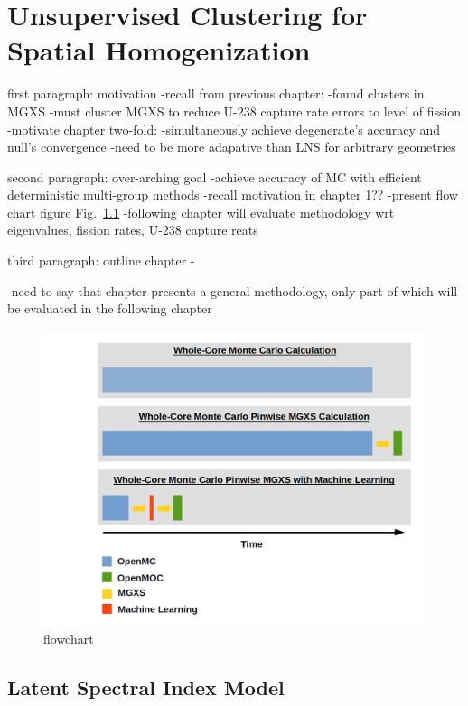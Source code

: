 \chapter{Unsupervised Clustering for Spatial Homogenization}
\label{chap:unsupervised}

first paragraph: motivation
-recall from previous chapter:
  -found clusters in \ac{MGXS}
  -must cluster \ac{MGXS} to reduce U-238 capture rate errors to level of fission
-motivate chapter two-fold:
  -simultaneously achieve degenerate's accuracy and null's convergence
  -need to be more adapative than \ac{LNS} for arbitrary geometries

second paragraph: over-arching goal
-achieve accuracy of \ac{MC} with efficient deterministic multi-group methods
-recall motivation in chapter 1??
-present flow chart figure Fig.~\ref{fig:chap10-flow-chart}
-following chapter will evaluate methodology wrt eigenvalues, fission rates, U-238 capture reats

third paragraph: outline chapter
-

-need to say that chapter presents a general methodology, only part of which will be evaluated in the following chapter

\begin{figure}
  \centering
  \includegraphics[width=\linewidth]{figures/pipeline/flow-chart}
  \caption{}
\caption[flowchar]{flowchart}
\label{fig:chap10-flow-chart}
\end{figure}
  

\section{Latent Spectral Index Model}
\label{sec:chap10-latent-model}

